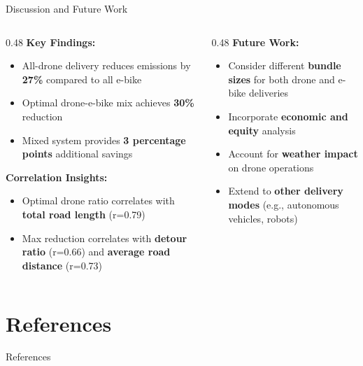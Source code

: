 \documentclass[9pt]{beamer}
\begin{document}
\begin{frame}{Discussion and Future Work}
  \begin{columns}
    \begin{column}{0.48\textwidth}
      \textbf{Key Findings:}
      \begin{itemize}
        \item All-drone delivery reduces emissions by \textbf{27\%} compared to all e-bike
        \item Optimal drone-e-bike mix achieves \textbf{30\%} reduction
        \item Mixed system provides \textbf{3 percentage points} additional savings
      \end{itemize}

      \vspace{0.5em}
      \textbf{Correlation Insights:}
      \begin{itemize}
        \item Optimal drone ratio correlates with \textbf{total road length} (r=0.79)
        \item Max reduction correlates with \textbf{detour ratio} (r=0.66) and \textbf{average road distance} (r=0.73)
      \end{itemize}
    \end{column}
    \begin{column}{0.48\textwidth}
      \textbf{Future Work:}
      \begin{itemize}
        \item Consider different \textbf{bundle sizes} for both drone and e-bike deliveries
        \item Incorporate \textbf{economic and equity} analysis
        \item Account for \textbf{weather impact} on drone operations
        \item Extend to \textbf{other delivery modes} (e.g., autonomous vehicles, robots)
      \end{itemize}
    \end{column}
  \end{columns}
\end{frame}

\section{References}

\begin{frame}[allowframebreaks]{References}
  \printbibliography
\end{frame}
\end{document}

